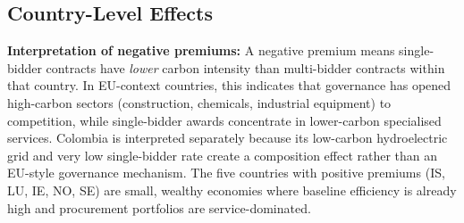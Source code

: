 \documentclass[11pt]{article}
\begin{document}
\subsection{Country-Level Effects}

\textbf{Interpretation of negative premiums:} A negative premium means single-bidder contracts have \textit{lower} carbon intensity than multi-bidder contracts within that country. In EU-context countries, this indicates that governance has opened high-carbon sectors (construction, chemicals, industrial equipment) to competition, while single-bidder awards concentrate in lower-carbon specialised services. Colombia is interpreted separately because its low-carbon hydroelectric grid and very low single-bidder rate create a composition effect rather than an EU-style governance mechanism. The five countries with positive premiums (IS, LU, IE, NO, SE) are small, wealthy economies where baseline efficiency is already high and procurement portfolios are service-dominated.
\end{document}
